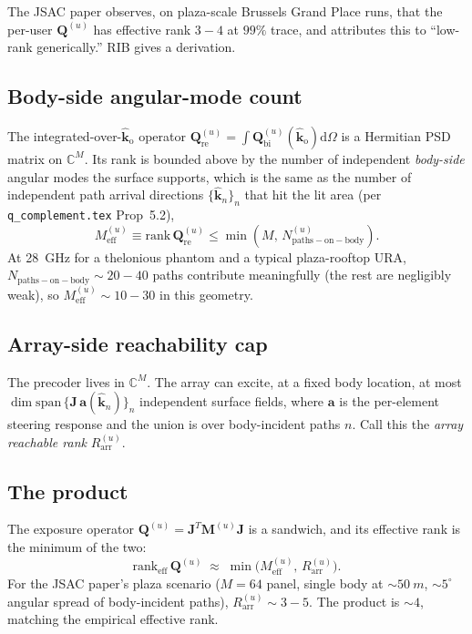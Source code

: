 \documentclass[11pt,a4paper]{article}
\theoremstyle{definition}
\newcommand{\khat}{\hat{\bm{k}}}
\newcommand{\diff}{\mathrm{d}}
\newcommand{\Complex}{\mathbb{C}}
\newcommand{\Qref}{\mathbf{Q}_{\mathrm{re}}}
\newcommand{\kout}{\hat{\bm{k}}_{\mathrm{o}}}
\newcommand{\Qbist}{\mathbf{Q}_{\mathrm{bi}}}
\newcommand{\Jmat}{\mathbf{J}}
\begin{document}
The JSAC paper observes, on plaza-scale Brussels Grand Place
runs, that the per-user $\mathbf{Q}^{(u)}$ has effective rank
$3{-}4$ at $99\%$ trace, and attributes this to
``low-rank generically.''  RIB gives a derivation.

\subsection{Body-side angular-mode count}

The integrated-over-$\kout$ operator $\Qref^{(u)}=
\int\Qbist^{(u)}(\kout)\diff\Omega$ is a Hermitian PSD matrix on
$\Complex^M$.  Its rank is bounded above by the number of independent
\emph{body-side} angular modes the surface supports, which is the
same as the number of independent path arrival directions
$\{\khat_n\}_n$ that hit the lit area (per
\texttt{q\_complement.tex} Prop~5.2),
\begin{equation}\label{eq:Meff}
  M_{\mathrm{eff}}^{(u)}\equiv
  \mathrm{rank}\,\Qref^{(u)}
  \le \min(M,\,N_{\mathrm{paths-on-body}}^{(u)}).
\end{equation}
At \SI{28}{GHz} for a thelonious phantom and a typical
plaza-rooftop URA, $N_{\mathrm{paths-on-body}}\sim 20{-}40$ paths
contribute meaningfully (the rest are negligibly weak), so
$M_{\mathrm{eff}}^{(u)}\sim 10{-}30$ in this geometry.

\subsection{Array-side reachability cap}

The precoder lives in $\Complex^M$.  The array can excite, at a
fixed body location, at most $\dim\mathrm{span}\,\{\Jmat\,\bm a(\khat_n)\}_n$
independent surface fields, where $\bm a$ is the per-element
steering response and the union is over body-incident paths $n$.
Call this the \emph{array reachable rank} $R_{\mathrm{arr}}^{(u)}$.

\subsection{The product}

The exposure operator
$\mathbf{Q}^{(u)}=\Jmat^T\mathbf{M}^{(u)}\Jmat$ is a sandwich, and
its effective rank is the minimum of the two:
\begin{equation}\label{eq:rank-product}
  \mathrm{rank}_{\mathrm{eff}}\,\mathbf{Q}^{(u)}
   \;\approx\;\min\bigl(M_{\mathrm{eff}}^{(u)},\,R_{\mathrm{arr}}^{(u)}\bigr).
\end{equation}
For the JSAC paper's plaza scenario ($M=64$ panel, single body at
$\sim\SI{50}{m}$, $\sim 5^\circ$ angular spread of body-incident
paths), $R_{\mathrm{arr}}^{(u)}\sim 3{-}5$.  The product is $\sim 4$,
matching the empirical effective rank.
\end{document}
